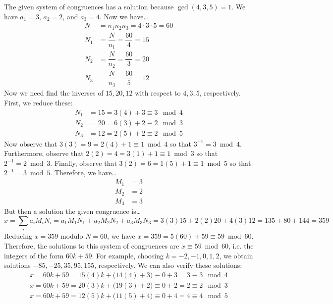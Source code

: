 \documentclass[11pt,letterpaper]{article}
\begin{document}
The given system of congruences has a solution because $\gcd(4, 3, 5)= 1$. We have $a_1= 3$, $a_2= 2$, and $a_3= 4$. Now we have\dots
	\[
	\begin{aligned}
	N&= n_1n_2n_3= 4 \cdot 3 \cdot 5= 60 \\
	N_1&= \dfrac{N}{n_1}= \dfrac{60}{4}= 15 \\ 
	N_2&= \dfrac{N}{n_2}= \dfrac{60}{3}= 20 \\
	N_3&= \dfrac{N}{n_3}= \dfrac{60}{5}= 12 
	\end{aligned}
	\]
Now we need find the inverses of $15, 20, 12$ with respect to $4, 3, 5$, respectively. First, we reduce these:
	\[
	\begin{aligned}
	N_1&= 15= 3(4) + 3 \equiv 3 \mod 4 \\
	N_2&= 20= 6(3) + 2 \equiv 2 \mod 3 \\
	N_3&= 12= 2(5) + 2 \equiv 2 \mod 5
	\end{aligned}
	\]
Now observe that $3(3)= 9= 2(4) + 1 \equiv 1 \bmod 4$ so that $3^{-1}= 3 \bmod 4$. Furthermore, observe that $2(2)= 4= 3(1) + 1 \equiv 1 \bmod 3$ so that $2^{-1}= 2 \bmod 3$. Finally, observe that $3(2)= 6= 1(5) + 1 \equiv 1 \bmod 5$ so that $2^{-1}= 3 \bmod 5$. Therefore, we have\dots
	\[
	\begin{aligned}
	M_1&= 3 \\
	M_2&= 2 \\
	M_3&= 3
	\end{aligned}
	\]
But then a solution the given congruence is\dots
	\[
	x= \sum_i a_i M_i N_i= a_1 M_1 N_1 + a_2 M_2 N_2 + a_3 M_3 N_3= 3(3)15 + 2(2)20 + 4(3)12= 135 + 80+ 144= 359
	\]
Reducing $x= 359$ modulo $N= 60$, we have $x= 359= 5(60) + 59 \equiv 59 \bmod 60$. Therefore, the solutions to this system of congruences are $x \equiv 59 \bmod 60$, i.e. the integers of the form $60k + 59$. For example, choosing $k= -2, -1, 0, 1, 2$, we obtain solutions $-85, -25, 35, 95, 155$, respectively. We can also verify these solutions:
	\[
	\begin{aligned}
	x= 60k + 59= 15(4)k + \big( 14(4) + 3 \big) \equiv 0 + 3= 3 \equiv 3 \mod 4 \\
	x= 60k + 59= 20(3)k + \big( 19(3) + 2 \big) \equiv 0 + 2= 2 \equiv 2 \mod 3 \\
	x= 60k + 59= 12(5)k + \big( 11(5) + 4 \big) \equiv 0 + 4= 4 \equiv 4 \mod 5
	\end{aligned}
	\]
\end{document}
